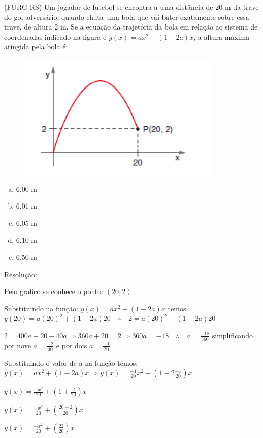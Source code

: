 \begin{multicols*}{2}
    \execnum (FURG-RS) Um jogador de futebol se encontra a uma distância de 20 m da trave do gol 					adversário, quando chuta uma bola que vai bater exatamente sobre essa trave, de altura 2 m. Se 			a equação da trajetória da bola em relação ao sistema de coordenadas indicado na figura é
    $y(x) = ax^2 + (1-2a)x$, a altura máxima atingida pela bola é:
    \begin{figure}[H]
        \centering
        \includegraphics[scale=0.5]{assets/rafael/img20.png}
    \end{figure}
    \begin{enumerate}[(a)]
        \item 6,00 m
        \item 6,01 m
        \item 6,05 m
        \item 6,10 m
        \item 6,50 m
    \end{enumerate}
    Resolução:

    Pelo gráfico se conhece o ponto: $(20,2)$

    Substituindo na função: $y(x) = ax^2 + (1-2a)x$ temos: $y(20) = a(20)^2 + (1-2a)20 \quad 				\therefore	\quad 2  = a(20)^2 + (1-2a)20 $

    $2 = 400a + 20 - 40a \Rightarrow 360a + 20 = 2 \Rightarrow 360a = -18 \quad \therefore \quad
        a = \frac{-18}{ 360}$ simplificando por nove $a = \frac{-2}{ 40}$ e por dois
    $a = \frac{-1}{ 20}$

    Substituindo o valor de a na função temos:
    $y(x) = ax^2 + (1-2a)x \Rightarrow y(x) = \frac{-1}{20} x^2 + \left( 1-2 \frac{-1}{20}
        \right)x $


    $y(x) = \frac{-x^2}{20} + \left( 1 + \frac{2}{20} \right)x$

    $y(x) = \frac{-x^2}{20} + \left(  \frac{20 +2 }{20} \right)x$

    $y(x) = \frac{-x^2}{20} + \left(  \frac{22 }{20} \right)x$


\end{multicols*}
